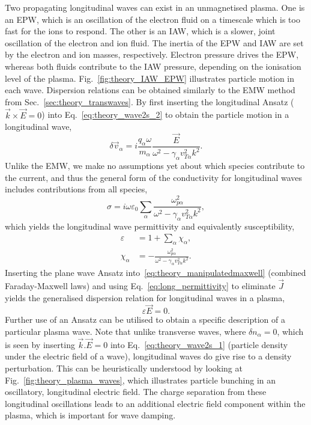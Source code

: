 Two propagating longitudinal waves can exist in an unmagnetised plasma.
One is an \ac{EPW}, which is an oscillation of the electron fluid on a timescale which is too fast for the ions to respond.
The other is an \ac{IAW}, which is a slower, joint oscillation of the electron and ion fluid.
The inertia of the \ac{EPW} and \ac{IAW} are set by the electron and ion masses, respectively.
Electron pressure drives the \ac{EPW}, whereas both fluids contribute to the \ac{IAW} pressure, depending on the ionisation level of the plasma.
Fig.~\ref{fig:theory_IAW_EPW} illustrates particle motion in each wave.
Dispersion relations can be obtained similarly to the \ac{EMW} method from Sec.~\ref{sec:theory_transwaves}.
By first inserting the longitudinal Ansatz ($\vec{k}\times\vec{E}=0$) into Eq.~\ref{eq:theory_wave2s_2} to obtain the particle motion in a longitudinal wave,
\begin{equation}
    \delta \vec{v}_\alpha = i \frac{q_\alpha \omega}{m_\alpha} \frac{\vec{E}}{\omega^2 - \gamma_\alpha v_{T\alpha}^2 k^2}.
\end{equation}
Unlike the \ac{EMW}, we make no assumptions yet about which species contribute to the current, and thus the general form of the conductivity for longitudinal waves includes contributions from all species,
\begin{equation}
    \sigma = i\omega\varepsilon_0 \sum_{\alpha} \frac{\omega_{p\alpha}^2}{\omega^2 - \gamma_\alpha v_{T\alpha}^2 k^2},
\end{equation}
which yields the longitudinal wave permittivity and equivalently susceptibility,
\begin{align}
    \label{eq:long_permittivity}
    \varepsilon &= 1 + \sum_\alpha \chi_\alpha,\\
    \label{eq:long_susceptibility}
    \chi_\alpha  &= - \frac{\omega_{p\alpha}^2}{\omega^2 - \gamma_\alpha v_{T\alpha}^2 k^2}.
\end{align}
Inserting the plane wave Ansatz into~\ref{eq:theory_manipulatedmaxwell} (combined Faraday-Maxwell laws) and using Eq.~\ref{eq:long_permittivity} to eliminate $\vec{J}$ yields the generalised dispersion relation for longitudinal waves in a plasma,
\begin{equation}
    \label{eq:long_disp_rel}
    \varepsilon \vec{E} = 0.
\end{equation}
Further use of an Ansatz can be utilised to obtain a specific description of a particular plasma wave.
Note that unlike transverse waves, where $\delta n_\alpha=0$, which is seen by inserting $\vec{k}.\vec{E}=0$ into Eq.~\ref{eq:theory_wave2s_1} (particle density under the electric field of a wave), longitudinal waves do give rise to a density perturbation.
This can be heuristically understood by looking at Fig.~\ref{fig:theory_plasma_waves}, which illustrates particle bunching in an oscillatory, longitudinal electric field.
The charge separation from these longitudinal oscillations leads to an additional electric field component within the plasma, which is important for wave damping.

